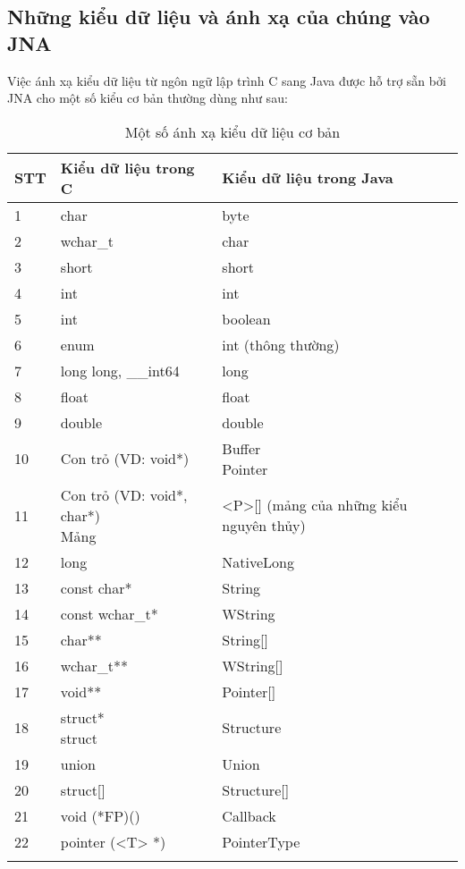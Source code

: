 	\subsection{Những kiểu dữ liệu và ánh xạ của chúng vào JNA}

Việc ánh xạ kiểu dữ liệu từ ngôn ngữ lập trình C sang Java được hỗ trợ sẵn bởi JNA cho một số kiểu cơ bản thường dùng như sau:\\

\begin{longtable}{ | m{3cm} | m{5cm} | m{5cm} | }
	\hline
STT & Kiểu dữ liệu trong C & Kiểu dữ liệu trong Java\\
	\hline
	\hline
1 & char & byte\\
	\hline
2 & wchar\_t & char\\
	\hline
3 & short & short\\
	\hline
4 & int & int\\
	\hline
5 & int & boolean\\
	\hline
6 & enum & int (thông thường)\\
	\hline
7  & long long, \_\_int64 & long\\
	\hline
8 & float & float\\
	\hline
9 & double & double\\
	\hline
10 & Con trỏ (VD: void*) & \specialcell{Buffer \\ Pointer}\\
	\hline
11 & \specialcell{Con trỏ (VD: void*, char*) \\ Mảng} & <P>[] (mảng của những kiểu nguyên thủy)\\
	\hline
12 & long & NativeLong\\
	\hline
13 & const char* & String\\
	\hline
14 & const wchar\_t* & WString\\
	\hline
15 & char** & String[]\\
	\hline
16 & wchar\_t** & WString[]\\
	\hline
17 & void** & Pointer[]\\
	\hline
18 & \specialcell{struct* \\ struct} & Structure\\
	\hline
19 & union & Union\\
	\hline
20 & struct[] & Structure[]\\
	\hline
21 & void (*FP)() & Callback\\
	\hline
22 & pointer (<T> *) & PointerType\\
	\hline

\caption[Một số ánh xạ kiểu dữ liệu cơ bản]{Một số ánh xạ kiểu dữ liệu cơ bản}
\label{table:tblwapi_type_mapping}
\end{longtable}

